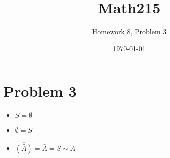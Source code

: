 \documentclass{article} %
\title{Math215} %
\author{Homework 8, Problem 3} %
\date{\today}
\begin{document}
\maketitle %

\section*{Problem 3} %
\begin{itemize}
\item $\bar{S} = \emptyset$
\item $\bar{\emptyset} = S$
\item $\overline{\overline{(\bar{A})}} = \bar{A} = S \sim A$
\end{itemize}
\end{document}
